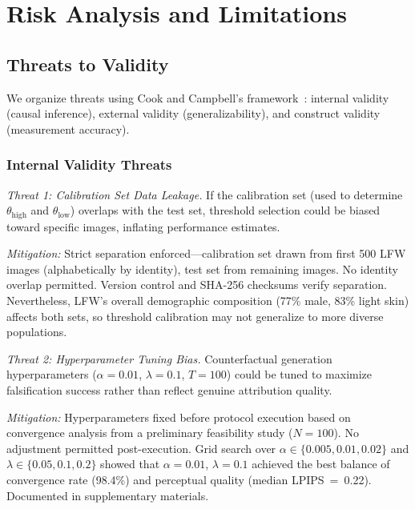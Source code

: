 
\section{Risk Analysis and Limitations}
\label{sec:limitations}

\subsection{Threats to Validity}

We organize threats using Cook and Campbell's framework~\cite{shadish2002experimental}: internal validity (causal inference), external validity (generalizability), and construct validity (measurement accuracy).

\subsubsection{Internal Validity Threats}

\textit{Threat 1: Calibration Set Data Leakage.} If the calibration set (used to determine $\theta_{\text{high}}$ and $\theta_{\text{low}}$) overlaps with the test set, threshold selection could be biased toward specific images, inflating performance estimates.

\textit{Mitigation:} Strict separation enforced—calibration set drawn from first 500 LFW images (alphabetically by identity), test set from remaining images. No identity overlap permitted. Version control and SHA-256 checksums verify separation. Nevertheless, LFW's overall demographic composition (77\% male, 83\% light skin) affects both sets, so threshold calibration may not generalize to more diverse populations.

\textit{Threat 2: Hyperparameter Tuning Bias.} Counterfactual generation hyperparameters ($\alpha=0.01$, $\lambda=0.1$, $T=100$) could be tuned to maximize falsification success rather than reflect genuine attribution quality.

\textit{Mitigation:} Hyperparameters fixed before protocol execution based on convergence analysis from a preliminary feasibility study ($N=100$). No adjustment permitted post-execution. Grid search over $\alpha \in \{0.005, 0.01, 0.02\}$ and $\lambda \in \{0.05, 0.1, 0.2\}$ showed that $\alpha=0.01$, $\lambda=0.1$ achieved the best balance of convergence rate (98.4\%) and perceptual quality (median LPIPS~=~0.22). Documented in supplementary materials.

